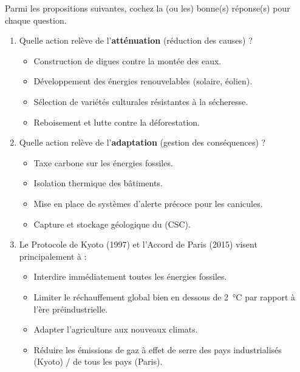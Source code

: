 \documentclass[11pt]{article}
\begin{document}
\begin{exercice}
Parmi les propositions suivantes, cochez la (ou les) bonne(s) réponse(s) pour chaque question.
\begin{enumerate}
\item Quelle action relève de l'\textbf{atténuation} (réduction des causes) ?
\begin{itemize}
\item[A.] Construction de digues contre la montée des eaux.
\item[B.] Développement des énergies renouvelables (solaire, éolien).
\item[C.] Sélection de variétés culturales résistantes à la sécheresse.
\item[D.] Reboisement et lutte contre la déforestation.
\end{itemize}
\item Quelle action relève de l'\textbf{adaptation} (gestion des conséquences) ?
\begin{itemize}
\item[A.] Taxe carbone sur les énergies fossiles.
\item[B.] Isolation thermique des bâtiments.
\item[C.] Mise en place de systèmes d'alerte précoce pour les canicules.
\item[D.] Capture et stockage géologique du  (CSC).
\end{itemize}
\item Le Protocole de Kyoto (1997) et l'Accord de Paris (2015) visent principalement à :
\begin{itemize}
\item[A.] Interdire immédiatement toutes les énergies fossiles.
\item[B.] Limiter le réchauffement global bien en dessous de \SI{2}{\celsius} par rapport à l'ère préindustrielle.
\item[C.] Adapter l'agriculture aux nouveaux climats.
\item[D.] Réduire les émissions de gaz à effet de serre des pays industrialisés (Kyoto) / de tous les pays (Paris).
\end{itemize}
\end{enumerate}
\end{exercice}
\end{document}
